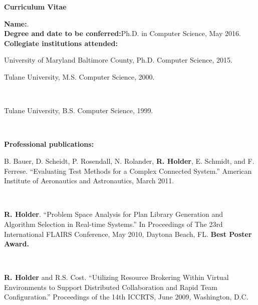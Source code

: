 \begin{titlepage}

\begin{center}
\vspace{0.1in}
\large{\bf Curriculum Vitae}
\bigskip \bigskip
\end{center}

\begin{flushleft}
  {\bf Name:}{\hspace{3mm}}\fullname{}.\\
	{\bf Degree and date to be conferred:}{\hspace{3mm}}Ph.D. in Computer Science, May 2016. \\
	{\bf Collegiate institutions attended:}\\
	\begin{singlespace} 
	{\hspace{0.4in}}University of Maryland Baltimore County, Ph.D. Computer Science, 2015. \\
	{\hspace{0.4in}}\parbox[t]{5.5in}{Tulane University, M.S. Computer Science, 2000.} \\
        {\hspace{0.4in}}\parbox[t]{5.5in}{Tulane University, B.S. Computer Science, 1999.} \\
	\end{singlespace} 
	\vspace{8pt}
	{\bf Professional publications:}\\
	\begin{singlespace} 
{\hspace{0.4in}} \parbox[t]{5.5in}{B. Bauer, D. Scheidt, P. Rosendall, N. Rolander, \textbf{R. Holder}, E. Schmidt, and F. Ferrese.  ``Evaluating Test Methods for a Complex Connected System.''  American Institute of Aeronautics and Astronautics, March 2011.}\\
{\vspace{5pt}}

{\hspace{0.4in}} \parbox[t]{5.5in}{\textbf{R. Holder}.  ``Problem Space Analysis for Plan Library Generation and Algorithm Selection in
Real-time Systems.'' In Proceedings of The 23rd International FLAIRS Conference, May 2010, Daytona Beach, FL.  \textbf{Best Poster Award.}}\\
{\vspace{5pt}}

{\hspace{0.4in}} \parbox[t]{5.5in}{\textbf{R. Holder} and R.S. Cost.  ``Utilizing Resource Brokering Within Virtual Environments to Support Distributed Collaboration and Rapid Team Configuration.'' Proceedings of the 14th ICCRTS, June 2009, Washington, D.C.}\\
{\vspace{5pt}}


\end{singlespace}
\end{flushleft}
\end{titlepage}
